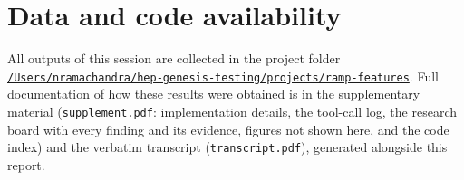 \documentclass[11pt,a4paper]{article}
\begin{document}
\section*{Data and code availability}
All outputs of this session are collected in the project folder \href{file:///Users/nramachandra/hep-genesis-testing/projects/ramp-features}{\texttt{/\allowbreak{}Users/\allowbreak{}nramachandra/\allowbreak{}hep-genesis-testing/\allowbreak{}projects/\allowbreak{}ramp-features}}.
Full documentation of how these results were obtained is in the supplementary material (\texttt{supplement.pdf}: implementation details, the tool-call log, the research board with every finding and its evidence, figures not shown here, and the code index) and the verbatim transcript (\texttt{transcript.pdf}), generated alongside this report.
\end{document}
